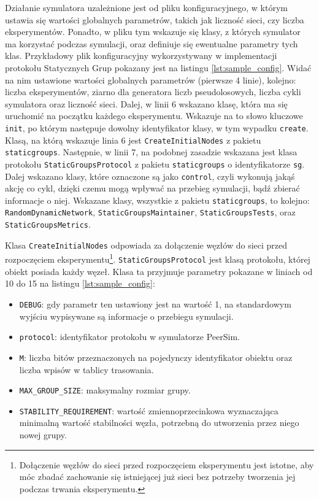 \documentclass[12pt, twoside, openany]{report}
\begin{document}


Działanie symulatora uzależnione jest od pliku konfiguracyjnego, w którym ustawia się wartości globalnych parametrów, takich jak liczność sieci, czy liczba eksperymentów. Ponadto, w pliku tym wskazuje się klasy, z których symulator ma korzystać podczas symulacji, oraz definiuje się ewentualne parametry tych klas. Przykładowy plik konfiguracyjny wykorzystywany w implementacji protokołu Statycznych Grup pokazany jest na listingu \ref{lst:sample_config}. Widać na nim ustawione wartości globalnych parametrów (pierwsze 4 linie), kolejno: liczba eksperymentów, ziarno dla generatora liczb pseudolosowych, liczba cykli symulatora oraz liczność sieci. Dalej, w linii 6 wskazano klasę, która ma się uruchomić na początku każdego eksperymentu. Wskazuje na to słowo kluczowe \texttt{init}, po którym następuje dowolny identyfikator klasy, w tym wypadku \texttt{create}. Klasą, na którą wskazuje linia 6 jest \texttt{CreateInitialNodes} z pakietu \texttt{staticgroups}. Następnie, w linii 7, na podobnej zasadzie wskazana jest klasa protokołu \texttt{StaticGroupsProtocol} z pakietu \texttt{staticgroups} o identyfikatorze \texttt{sg}. Dalej wskazano klasy, które oznaczone są jako \texttt{control}, czyli wykonują jakąś akcję co cykl, dzięki czemu mogą wpływać na przebieg symulacji, bądź zbierać informacje o niej. Wskazane klasy, wszystkie z pakietu \texttt{staticgroups}, to kolejno: \texttt{RandomDynamicNetwork}, \texttt{StaticGroupsMaintainer}, \texttt{StaticGroupsTests}, oraz \texttt{StaticGroupsMetrics}. 

Klasa \texttt{CreateInitialNodes} odpowiada za dołączenie węzłów do sieci przed rozpoczęciem eksperymentu\footnote{Dołączenie węzłów do sieci przed rozpoczęciem eksperymentu jest istotne, aby móc zbadać zachowanie się istniejącej już sieci bez potrzeby tworzenia jej podczas trwania eksperymentu.}. \texttt{StaticGroupsProtocol} jest klasą protokołu, której obiekt posiada każdy węzeł. Klasa ta przyjmuje parametry pokazane w liniach od 10 do 15 na listingu \ref{lst:sample_config}:
\begin{itemize}
\item \texttt{DEBUG}: gdy parametr ten ustawiony jest na wartość 1, na standardowym wyjściu wypisywane są informacje o przebiegu symulacji.
\item \texttt{protocol}: identyfikator protokołu w symulatorze PeerSim.
\item \texttt{M}: liczba bitów przeznaczonych na pojedynczy identyfikator obiektu oraz liczba wpisów w tablicy trasowania.
\item \texttt{MAX\_GROUP\_SIZE}: maksymalny rozmiar grupy.
\item \texttt{STABILITY\_REQUIREMENT}: wartość zmiennoprzecinkowa wyznaczająca minimalną wartość stabilności węzła, potrzebną do utworzenia przez niego nowej grupy.
\end{itemize}
\end{document}
